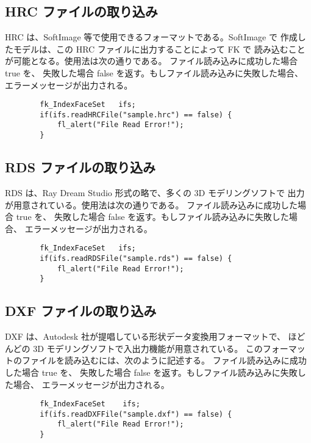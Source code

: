 \subsection{HRC ファイルの取り込み}
HRC は、SoftImage 等で使用できるフォーマットである。SoftImage で
作成したモデルは、この HRC ファイルに出力することによって FK で
読み込むことが可能となる。使用法は次の通りである。
ファイル読み込みに成功した場合 true を、
失敗した場合 false を返す。もしファイル読み込みに失敗した場合、
エラーメッセージが出力される。
\\
\begin{screen}
\begin{verbatim}
        fk_IndexFaceSet   ifs;
        if(ifs.readHRCFile("sample.hrc") == false) {
            fl_alert("File Read Error!");
        }
\end{verbatim}
\end{screen}
\subsection{RDS ファイルの取り込み}
RDS は、Ray Dream Studio 形式の略で、多くの 3D モデリングソフトで
出力が用意されている。使用法は次の通りである。
ファイル読み込みに成功した場合 true を、
失敗した場合 false を返す。もしファイル読み込みに失敗した場合、
エラーメッセージが出力される。
\\
\begin{screen}
\begin{verbatim}
        fk_IndexFaceSet   ifs;
        if(ifs.readRDSFile("sample.rds") == false) {
            fl_alert("File Read Error!");
        }
\end{verbatim}
\end{screen}
\subsection{DXF ファイルの取り込み}
DXF は、Autodesk 社が提唱している形状データ変換用フォーマットで、
ほどんどの 3D モデリングソフトで入出力機能が用意されている。
このフォーマットのファイルを読み込むには、次のように記述する。
ファイル読み込みに成功した場合 true を、
失敗した場合 false を返す。もしファイル読み込みに失敗した場合、
エラーメッセージが出力される。
\\
\begin{screen}
\begin{verbatim}
        fk_IndexFaceSet    ifs;
        if(ifs.readDXFFile("sample.dxf") == false) {
            fl_alert("File Read Error!");
        }
\end{verbatim}
\end{screen}
